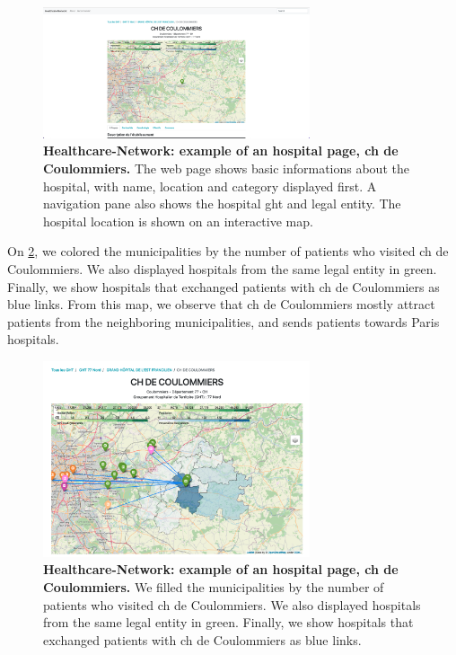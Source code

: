 \begin{figure}[H]
    \includegraphics[width=0.7\textwidth]{images/healthcare-network/hospital-page.png}
    \centering
    \caption{
        \textbf{Healthcare-Network: example of an hospital page, \acf{ch} de Coulommiers.} The web page shows basic informations about the hospital, with name, location and category displayed first. A navigation pane also shows the hospital \ac{ght} and legal entity. The hospital location is shown on an interactive map.
    }
    \label{fig:hn-coulommiers-page}
\end{figure}

On \cref{fig:hn-coulommiers-co-occ}, we colored the municipalities by the number of patients who visited \ac{ch} de Coulommiers. We also displayed hospitals from the same legal entity in green. Finally, we show hospitals that exchanged patients with \ac{ch} de Coulommiers as blue links. From this map, we observe that \ac{ch} de Coulommiers mostly attract patients from the neighboring municipalities, and sends patients towards Paris hospitals.

\begin{figure}[H]
    \includegraphics[width=0.7\textwidth]{images/healthcare-network/coulommiers-co-occ.png}
    \centering
    \caption{
        \textbf{Healthcare-Network: example of an hospital page, \acf{ch} de Coulommiers.} We filled the municipalities by the number of patients who visited \ac{ch} de Coulommiers. We also displayed hospitals from the same legal entity in green. Finally, we show hospitals that exchanged patients with \ac{ch} de Coulommiers as blue links.
    }
    \label{fig:hn-coulommiers-co-occ}
\end{figure}

